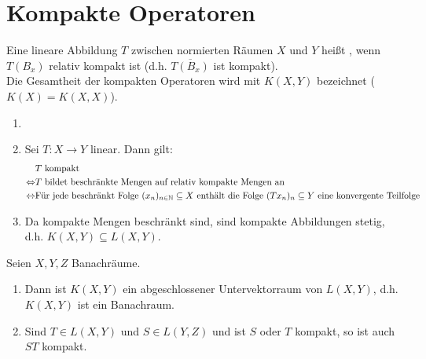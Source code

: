 \chapter{Kompakte Operatoren}
\begin{definition}
	Eine lineare Abbildung $ T $ zwischen normierten R\"aumen $ X $ und $ Y $ hei\ss t , wenn $ T(B_x) $ relativ kompakt ist (d.h. $ \overline{T(B_x)} $ ist kompakt).\\
	Die Gesamtheit der kompakten Operatoren wird mit $ K(X,Y) $ bezeichnet ($ K(X)=K(X,X) $).
\end{definition}
\begin{bemerkung*}
	\begin{enumerate}
		\item[]
		\item Sei $ T\colon X\rightarrow Y $ linear. Dann gilt:
		\begin{align*} &T\text{ kompakt}\\\Leftrightarrow&T\text{ bildet beschr\"ankte Mengen auf relativ kompakte Mengen an}\\
		\Leftrightarrow&\text{F\"ur jede beschr\"ankt Folge }(x_n)_{n\in\mathbb{N}}\subseteq X\text{ enth\"alt die Folge }(Tx_n)_n\subseteq Y\text{ eine konvergente Teilfolge} \end{align*}
		\item Da kompakte Mengen beschr\"ankt sind, sind kompakte Abbildungen stetig, d.h. $ K(X,Y)\subseteq L(X,Y) $.
	\end{enumerate}
\end{bemerkung*}
\begin{satz}
	Seien $ X,Y,Z $ Banachr\"aume.
	\begin{enumerate}
		\item Dann ist $ K(X,Y) $ ein abgeschlossener Untervektorraum von $ L(X,Y) $, d.h. $ K(X,Y) $ ist ein Banachraum.
		\item Sind $ T\in L(X,Y) $ und $ S\in L(Y,Z) $ und ist $ S $ oder $ T $ kompakt, so ist auch $ ST $ kompakt.
	\end{enumerate}
\end{satz}
